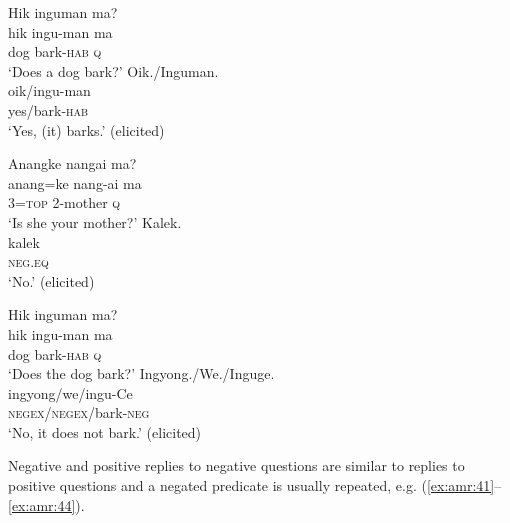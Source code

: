 \documentclass[output=paper,colorlinks,citecolor=brown]{langscibook}
\begin{document}
\ea\label{ex:amr:38}
    \begin{xlist}
    Hik inguman ma?\\ 
        \gll hik ingu-man ma\\ 
             dog bark-\textsc{hab} \textsc{q}\\
        \glt ‘Does a dog bark?'
      Oik./Inguman.\\ 
        \gll oik/ingu-man\\
               yes/bark\textsc{{}-hab}\\
        \glt ‘Yes, (it) barks.’ (elicited)
    \end{xlist}
    \z


\ea\label{ex:amr:39}
    \begin{xlist}
     Anangke nangai ma?\\ 
        \gll anang=ke nang-ai ma\\ 
              3=\textsc{top} 2-mother \textsc{q}\\
        \glt ‘Is she your mother?'
\newpage
     Kalek.\\
        \gll  kalek\\
              \textsc{neg}.\textsc{eq}\\
        \glt ‘No.' (elicited)
    \end{xlist}
\z
    \ea\label{ex:amr:40}
    \begin{xlist}
     Hik inguman ma?\\ 
        \gll hik ingu-man ma\\ 
              dog bark-\textsc{hab} \textsc{q} \\
        \glt ‘Does the dog bark?'
     Ingyong./We./Inguge.\\
        \gll  ingyong/we/ingu-Ce\\
              \textsc{negex}/\textsc{negex}/bark-\textsc{neg}\\
        \glt ‘No, it does not bark.’ (elicited)
    \end{xlist}
    \z
 

Negative and positive replies to negative questions are similar to replies to positive questions and a negated predicate is usually repeated, e.g. (\ref{ex:amr:41}--\ref{ex:amr:44}).
\end{document}
